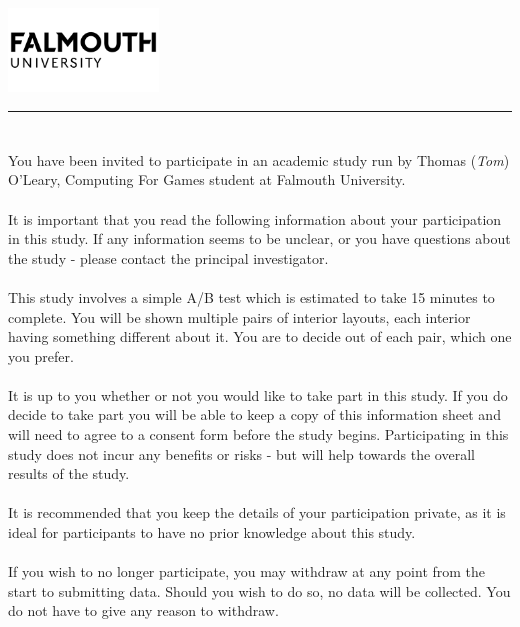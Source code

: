 \documentclass{article}
\begin{document}
\includegraphics[width=0.3\textwidth]{falmouth-university-vector-logo.png}
\vspace{-1em}

\rule{\linewidth}{1pt}
\bigskip

\section*{}
You have been invited to participate in an academic study run by Thomas (\textit{Tom}) O’Leary, Computing For Games student at Falmouth University.
\\
\\
It is important that you read the following information about your participation in this study.
If any information seems to be unclear, or you have questions about the study - please contact the principal investigator.
\\
\\
This study involves a simple A/B test which is estimated to take 15 minutes to complete. 
You will be shown multiple pairs of interior layouts, each interior having something different 
about it. 
You are to decide out of each pair, which one you prefer. 
\\
\\
It is up to you whether or not you would like to take part in this study. 
If you do decide to take part you will be able to keep a copy of this information sheet 
and will need to agree to a consent form before the study begins.
Participating in this study does not incur any benefits or risks - but will help towards the overall results of the study.
\\
\\
It is recommended that you keep the details of your participation private, as it is ideal for participants to have no prior knowledge about this study.
\\
\\
If you wish to no longer participate, you may withdraw at any point from the start to submitting data. Should you wish to do so, no data will be collected. You do not have to give any reason to withdraw.
\bigskip
\end{document}
